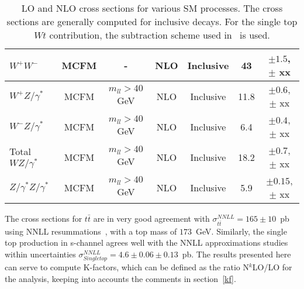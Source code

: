 \begin{table}[hbt]
\begin{center}
\begin{tabular}{|l|c|c|c|c|c|c|}
$W^+W^-$ & MCFM & - & NLO & Inclusive & 43 & $\pm 1.5$, $\pm$ xx \\ \hline
$W^+Z/\gamma^*$ & MCFM & $m_{ll} > 40$ GeV & NLO & Inclusive & 11.8 & $\pm 0.6$, $\pm$ xx \\ \hline
$W^-Z/\gamma^*$ & MCFM & $m_{ll} > 40$ GeV & NLO & Inclusive & 6.4 & $\pm 0.4$, $\pm$ xx \\ \hline
Total $WZ/\gamma^*$ & MCFM & $m_{ll} > 40$ GeV & NLO & Inclusive & 18.2 & $\pm 0.7$, $\pm$ xx \\ \hline
$Z/\gamma^*Z/\gamma^*$ & MCFM & $m_{ll} > 40$ GeV & NLO & Inclusive & 5.9 & $\pm 0.15$, $\pm$ xx \\ \hline
\end{tabular} 
\caption{LO and NLO cross sections for various SM processes. The cross sections are generally
computed for inclusive decays. For the single top $Wt$ contribution, the subtraction scheme
used in~\cite{Wtsubscheme} is used. \label{tab:nlo}}
\end{center}
\end{table}

The cross sections for $t\bar{t}$ are in very good agreement with 
$\sigma^{NNLL}_{t\bar{t}} = 165 \pm 10$~pb using NNLL 
resummations~\cite{nnllttbar}, with a top mass of $173$~GeV. Similarly, the 
single top production in s-channel agrees well with the NNLL approximations 
studies~\cite{nnllschannel} within uncertainties 
$\sigma^{NNLL}_{Single top} = 4.6 \pm 0.06 \pm 0.13$~pb. The results presented 
here can serve to compute K-factors, which can be defined as the ratio 
N$^k$LO/LO for the analysis, keeping into accounts the comments in section~\ref{kf}.


